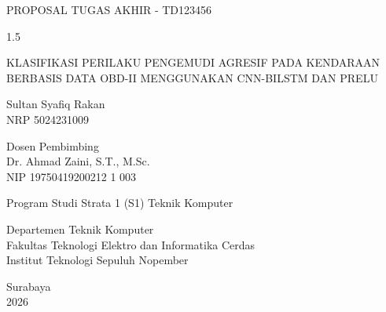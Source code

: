 \begin{large}
  PROPOSAL TUGAS AKHIR - TD123456
\end{large}

\vspace{\fill}

\begin{spacing}{1.5}
  \begin{Large}
    KLASIFIKASI PERILAKU PENGEMUDI AGRESIF PADA KENDARAAN BERBASIS DATA OBD-II MENGGUNAKAN CNN-BILSTM DAN PRELU
  \end{Large}
\end{spacing}

\vspace{\fill}

\begin{large}
  Sultan Syafiq Rakan \\
  \textmd{NRP 5024231009}
\end{large}

\vspace{\fill}

\begin{large}
  \textmd{Dosen Pembimbing} \\
  Dr. Ahmad Zaini, S.T., M.Sc. \\
  \textmd{NIP 19750419200212 1 003}
\end{large}

\vspace{\fill}

Program Studi Strata 1 (S1) Teknik Komputer \\

\mdseries

Departemen Teknik Komputer \\
Fakultas Teknologi Elektro dan Informatika Cerdas \\
Institut Teknologi Sepuluh Nopember

Surabaya \\
2026

